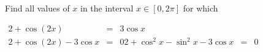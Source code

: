 \begin{frame}
\begin{example}
Find all values of $x$ in the interval $x\in[0,2\pi]$ for which

$\begin{array}{rclll}
2+\cos (2x)&=&3\cos x \\
2+\cos (2x) - 3\cos x&=&0
2+\cos^2x-\sin^2x - 3\cos x&=&0
\end{array}
$
\end{example}
\end{frame}